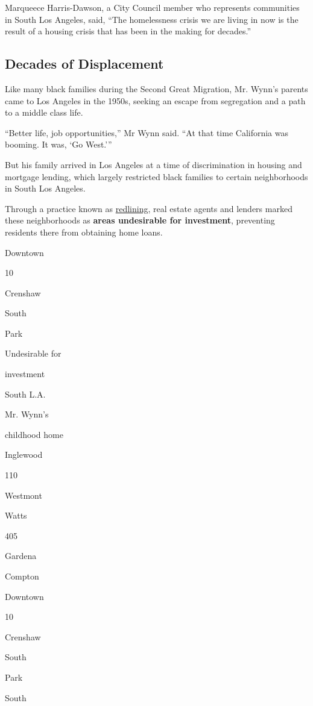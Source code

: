 Marqueece Harris-Dawson, a City Council member who represents
communities in South Los Angeles, said, ``The homelessness crisis we are
living in now is the result of a housing crisis that has been in the
making for decades.''

\hypertarget{decades-of-displacement}{%
\subsection{Decades of Displacement}\label{decades-of-displacement}}

Like many black families during the Second Great Migration, Mr. Wynn's
parents came to Los Angeles in the 1950s, seeking an escape from
segregation and a path to a middle class life.

``Better life, job opportunities,'' Mr Wynn said. ``At that time
California was booming. It was, `Go West.'''

But his family arrived in Los Angeles at a time of discrimination in
housing and mortgage lending, which largely restricted black families to
certain neighborhoods in South Los Angeles.

Through a practice known as
\href{https://clkrep.lacity.org/onlinedocs/2019/19-0600_misc_5-6-19.pdf}{redlining},
real estate agents and lenders marked these neighborhoods as
\textbf{areas undesirable for investment}, preventing residents there
from obtaining home loans.

Downtown

10

Crenshaw

South

Park

Undesirable for

investment

South L.A.

Mr. Wynn's

childhood home

Inglewood

110

Westmont

Watts

405

Gardena

Compton

Downtown

10

Crenshaw

South

Park

South

